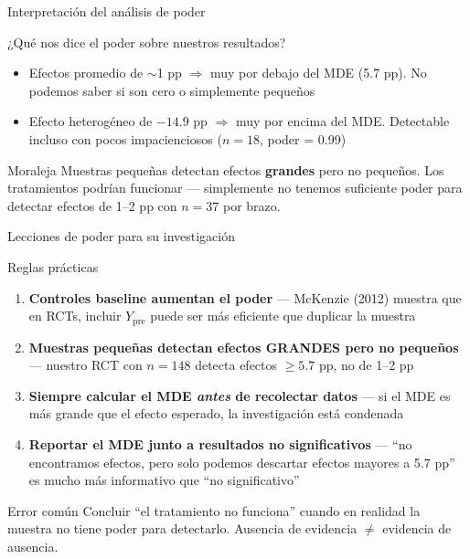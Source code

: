 \documentclass[aspectratio=169, 11pt]{beamer}
\begin{document}
\begin{frame}{Interpretación del análisis de poder}
\begin{block}{¿Qué nos dice el poder sobre nuestros resultados?}
\small
\begin{itemize}\setlength{\itemsep}{4pt}
  \item Efectos promedio de $\sim$1 pp $\Rightarrow$ muy por debajo del MDE (5.7 pp). No podemos saber si son cero o simplemente pequeños
  \item Efecto heterogéneo de $-14.9$ pp $\Rightarrow$ muy por encima del MDE. Detectable incluso con pocos impacienciosos ($n = 18$, poder = 0.99)
\end{itemize}
\end{block}

\vspace{0.3cm}
\begin{alertblock}{Moraleja}
Muestras pequeñas detectan efectos \textbf{grandes} pero no pequeños. Los tratamientos podrían funcionar --- simplemente no tenemos suficiente poder para detectar efectos de 1--2 pp con $n = 37$ por brazo.
\end{alertblock}
\end{frame}

\begin{frame}{Lecciones de poder para su investigación}
\begin{exampleblock}{Reglas prácticas}
\small
\begin{enumerate}\setlength{\itemsep}{4pt}
  \item \textbf{Controles baseline aumentan el poder} --- McKenzie (2012) muestra que en RCTs, incluir $Y_{\text{pre}}$ puede ser más eficiente que duplicar la muestra

  \item \textbf{Muestras pequeñas detectan efectos GRANDES pero no pequeños} --- nuestro RCT con $n = 148$ detecta efectos $\geq 5.7$ pp, no de 1--2 pp

  \item \textbf{Siempre calcular el MDE \textit{antes} de recolectar datos} --- si el MDE es más grande que el efecto esperado, la investigación está condenada

  \item \textbf{Reportar el MDE junto a resultados no significativos} --- ``no encontramos efectos, pero solo podemos descartar efectos mayores a 5.7 pp'' es mucho más informativo que ``no significativo''
\end{enumerate}
\end{exampleblock}

\vspace{0.2cm}
\begin{alertblock}{Error común}
Concluir ``el tratamiento no funciona'' cuando en realidad la muestra no tiene poder para detectarlo. Ausencia de evidencia $\neq$ evidencia de ausencia.
\end{alertblock}
\end{frame}
\end{document}
